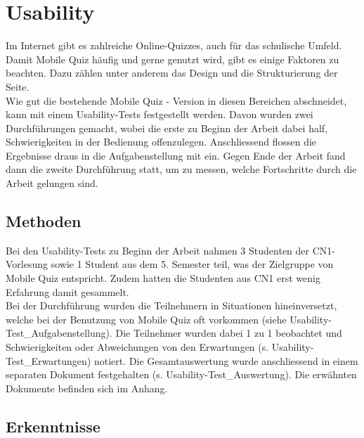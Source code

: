


\section{Usability}
Im Internet gibt es zahlreiche Online-Quizzes, auch für das schulische Umfeld. Damit Mobile Quiz häufig und gerne genutzt wird, gibt es einige Faktoren zu beachten. \cite{marketingfire.de} Dazu zählen unter anderem das Design und die Strukturierung der Seite. \\

Wie gut die bestehende Mobile Quiz - Version in diesen Bereichen abschneidet, kann mit einem \gls{Usability-Tests} festgestellt werden. Davon wurden zwei Durchführungen gemacht, wobei die erste zu Beginn der Arbeit dabei half, Schwierigkeiten in der Bedienung offenzulegen. Anschliessend flossen die Ergebnisse draus in die Aufgabenstellung mit ein. Gegen Ende der Arbeit fand dann die zweite Durchführung statt, um zu messen, welche Fortschritte durch die Arbeit gelungen sind.

\subsection{Methoden}
Bei den \gls{Usability-Tests} zu Beginn der Arbeit nahmen 3 Studenten der \acrfull{CN1}-Vorlesung sowie 1 Student aus dem 5. Semester teil, was der Zielgruppe von Mobile Quiz entspricht. Zudem hatten die Studenten aus \acrshort{CN1} erst wenig Erfahrung damit gesammelt. \\
Bei der Durchführung wurden die Teilnehmern in Situationen hineinversetzt, welche bei der Benutzung von Mobile Quiz oft vorkommen (siehe Usability-Test\_Aufgabenstellung). Die Teilnehmer wurden dabei 1 zu 1 beobachtet und Schwierigkeiten oder Abweichungen von den Erwartungen (s. Usability-Test\_Erwartungen) notiert. Die Gesamtauswertung wurde anschliessend in einem separaten Dokument festgehalten (s. Usability-Test\_Auswertung). Die erwähnten Dokumente befinden sich im Anhang.

\subsection{Erkenntnisse}


